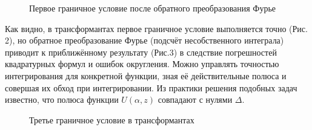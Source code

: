 \documentclass[a4paper, 12pt]{article}
\begin{document}
\begin{figure}[h!]
\noindent{}
\caption{Первое граничное условие после обратного преобразования Фурье}
\label{figCurves}
\end{figure}

Как видно, в трансформантах первое граничное условие выполняется точно (Рис. 2), но обратное преобразование Фурье (подсчёт несобственного интеграла) приводит к приближённому результату (Рис.3) в следствие погрешностей квадратурных формул и ошибок округления. Можно управлять точностью интегрирования для конкретной функции, зная её действительные полюса и совершая их обход при интегрировании. Из практики решения подобных задач известно, что полюса функции $U(\alpha,z)$ совпадают с нулями $\Delta$.

\begin{figure}[h!]
\noindent{}
\caption{Третье граничное условие в трансформантах}
\label{figCurves}
\end{figure}
\end{document}
